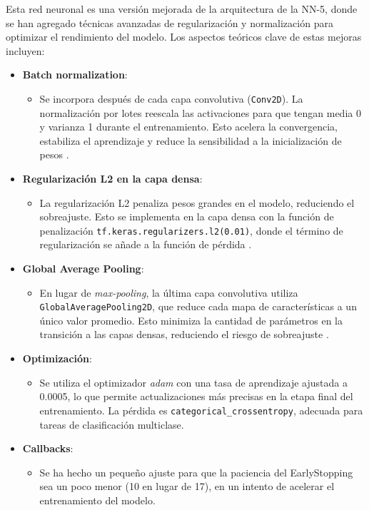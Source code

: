 Esta red neuronal es una versión mejorada de la arquitectura de la NN-5, donde se han agregado técnicas avanzadas de regularización y normalización para optimizar el rendimiento del modelo. Los aspectos teóricos clave de estas mejoras incluyen:

\begin{itemize}
	\item \textbf{Batch normalization}:
	\begin{itemize}
		\item Se incorpora después de cada capa convolutiva (\texttt{Conv2D}). La normalización por lotes reescala las activaciones para que tengan media 0 y varianza 1 durante el entrenamiento. Esto acelera la convergencia, estabiliza el aprendizaje y reduce la sensibilidad a la inicialización de pesos \parencite{ioffe2015batchnorm}.
	\end{itemize}
	
	\item \textbf{Regularización L2 en la capa densa}:
	\begin{itemize}
		\item La regularización L2 penaliza pesos grandes en el modelo, reduciendo el sobreajuste. Esto se implementa en la capa densa con la función de penalización \texttt{tf.keras.regularizers.l2(0.01)}, donde el término de regularización se añade a la función de pérdida \parencite{goodfellow2016deep}.
	\end{itemize}
	
	\item \textbf{Global Average Pooling}:
	\begin{itemize}
		\item En lugar de \textit{max-pooling}, la última capa convolutiva utiliza \texttt{GlobalAveragePooling2D}, que reduce cada mapa de características a un único valor promedio. Esto minimiza la cantidad de parámetros en la transición a las capas densas, reduciendo el riesgo de sobreajuste \parencite{lin2013network}.
	\end{itemize}
	
	\item \textbf{Optimización}:
	\begin{itemize}
		\item Se utiliza el optimizador \textit{adam} con una tasa de aprendizaje ajustada a 0.0005, lo que permite actualizaciones más precisas en la etapa final del entrenamiento. La pérdida es \texttt{categorical\_crossentropy}, adecuada para tareas de clasificación multiclase.
	\end{itemize}
	
	\item \textbf{Callbacks}:
	\begin{itemize}
		\item Se ha hecho un pequeño ajuste para que la paciencia del EarlyStopping sea un poco menor (10 en lugar de 17), en un intento de acelerar el entrenamiento del modelo. 
	\end{itemize}
\end{itemize}

